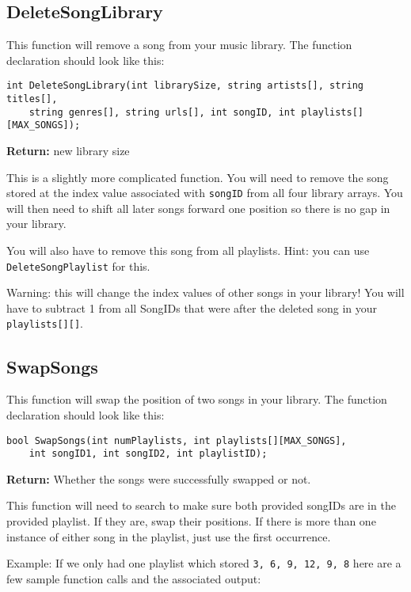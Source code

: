 \subsection{DeleteSongLibrary \star \star \star}
This function will remove a song from your music library. The function declaration should look like this:

\begin{verbatim}
int DeleteSongLibrary(int librarySize, string artists[], string titles[], 
    string genres[], string urls[], int songID, int playlists[][MAX_SONGS]);
\end{verbatim}

\textbf{Return:} new library size

This is a slightly more complicated function. You will need to remove the song stored at the index value associated with \texttt{songID} from all four library arrays. You will then need to shift all later songs forward one position so there is no gap in your library. 

You will also have to remove this song from all playlists. Hint: you can use \texttt{DeleteSongPlaylist} for this. 

Warning: this will change the index values of other songs in your library! You will have to subtract 1 from all SongIDs that were after the deleted song in your \texttt{playlists[][]}.

\subsection{SwapSongs \star \star}
This function will swap the position of two songs in your library. The function declaration should look like this:

\begin{verbatim}
bool SwapSongs(int numPlaylists, int playlists[][MAX_SONGS], 
    int songID1, int songID2, int playlistID);
\end{verbatim}

\textbf{Return:} Whether the songs were successfully swapped or not.

This function will need to search to make sure both provided songIDs are in the provided playlist. If they are, swap their positions. If there is more than one instance of either song in the playlist, just use the first occurrence. 

Example: If we only had one playlist which stored \texttt{{3, 6, 9, 12, 9, 8}} here are a few sample function calls and the associated output:

